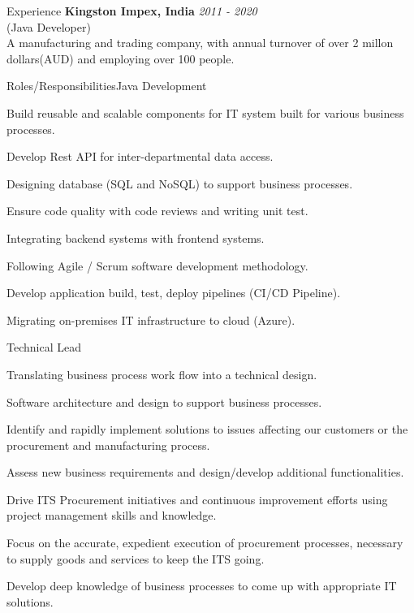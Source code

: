 \documentclass{resume}
\begin{document}
\begin{rSection}{Experience}
{\bf Kingston Impex, India} \hfill {\em  2011 - 2020} 
\\(Java Developer)
\\A manufacturing and trading company, with annual turnover of over 2 millon dollars(AUD) and employing over 100 people.\\


\begin{rSubsection}{Roles/Responsibilities}{}{Java Development}{}
\item Build reusable and scalable components for IT system built for various business processes.
\item Develop Rest API for inter-departmental data access.
\item Designing database (SQL and NoSQL) to support business processes.
\item Ensure code quality with code reviews and writing unit test.
\item Integrating backend systems with frontend systems.
\item Following Agile / Scrum software development methodology.
\item Develop application build, test, deploy pipelines (CI/CD Pipeline).
\item Migrating on-premises IT infrastructure to cloud (Azure).
\end{rSubsection}

\begin{rSubsection}{}{}{Technical Lead}{}
\item Translating business process work flow into a technical design.
\item Software architecture and design to support business processes.
\item Identify and rapidly implement solutions to issues affecting our customers or the procurement and manufacturing process.
\item Assess new business requirements and design/develop additional functionalities.
\item Drive ITS Procurement initiatives and continuous improvement efforts using project management skills and knowledge.
\item Focus on the accurate, expedient execution of procurement processes, necessary to supply goods and services to keep the ITS going.
\item Develop deep knowledge of business processes to come up with appropriate IT solutions.
\end{rSubsection}


\end{rSection}
\end{document}

